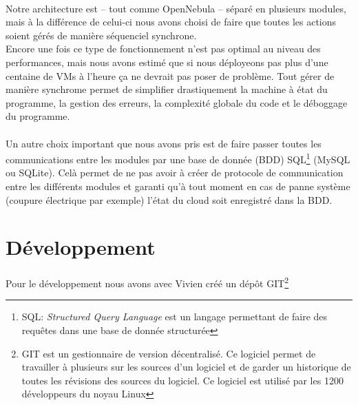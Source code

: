 \paragraph*{}
Notre architecture est -- tout comme OpenNebula -- séparé en plusieurs modules, mais à la différence de celui-ci nous avons choisi de faire que toutes les actions soient gérés
de manière séquenciel synchrone.\\ %
Encore une fois ce type de fonctionnement n'est pas optimal au niveau des performances, mais nous avons estimé que si nous déployeons pas plus d'une centaine de VMs à
l'heure ça ne devrait pas poser de problème.
Tout gérer de manière synchrome permet de simplifier drastiquement la machine à état du programme, la gestion des erreurs, la complexité globale du code et le déboggage
du programme.

\paragraph*{}
Un autre choix important que nous avons pris est de faire passer toutes les communications entre les modules par une base de donnée (BDD)
SQL\footnote{SQL: \emph{Structured Query Language} est un langage permettant de faire des requêtes dans une base de donnée structurée} (MySQL ou SQLite).
Celà permet de ne pas avoir à créer de protocole de communication entre les différents modules et garanti qu'à tout moment en cas de panne système (coupure électrique
par exemple) l'état du cloud soit enregistré dans la BDD.

\section{Développement}

\paragraph*{}
Pour le développement nous avons avec Vivien créé un dépôt GIT\footnote{GIT est un gestionnaire de version décentralisé. Ce logiciel permet de travailler à plusieurs
sur les sources d'un logiciel et de garder un historique de toutes les révisions des sources du logiciel. Ce logiciel est utilisé par les 1200 développeurs du noyau Linux}

